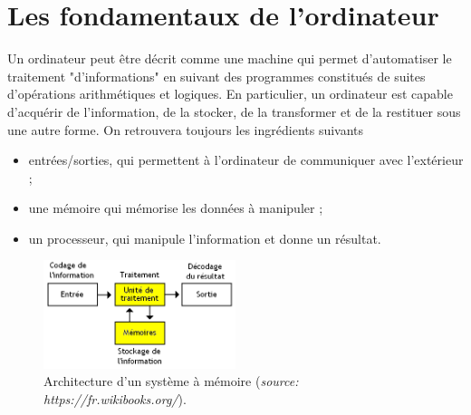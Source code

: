 
%
\section{Les fondamentaux de l'ordinateur}
Un ordinateur peut être décrit comme une machine qui permet d'automatiser le traitement "d'informations" en suivant  des programmes constitués de suites d’opérations arithmétiques et logiques. En particulier, un ordinateur est capable d’acquérir de l’information, de la stocker, de la transformer et de la restituer sous une autre forme. On retrouvera toujours les ingrédients suivants
\begin{itemize}
	\item entrées/sorties, qui permettent à l'ordinateur de communiquer avec l'extérieur ;
	\item une mémoire qui mémorise les données à manipuler ;
	\item un processeur, qui manipule l'information et donne un résultat.
\end{itemize}

\begin{figure}[h!]
	\centering
	\includegraphics[trim=10 0 20 0,width=0.5\textwidth]{Images/ordinateur/Architecture_Von_Neumann_basic.png}
	\caption{Architecture d'un système à mémoire (\textit{source: https://fr.wikibooks.org/}).}
\end{figure}

